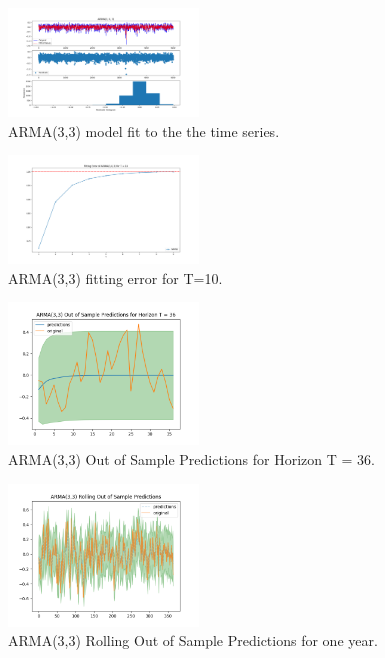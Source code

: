 \documentclass[conference]{IEEEtran}
\begin{document}
\begin{figure}[ht]
    \centering
    \includegraphics[width=0.45\textwidth]{Figures/GlasnevinLin/ARIMA(3,0,3).png}
    \caption{ARMA(3,3) model fit to the the time series.}
    \label{ma33g}
\end{figure}

\begin{figure}[ht]
    \centering
    \includegraphics[width=0.45\textwidth]{Figures/GlasnevinLin/Fitting Error of ARIMA(3,0,3) for T = 10.png}
    \caption{ARMA(3,3) fitting error for T=10.}
    \label{fe33g}
\end{figure}
\vspace{80mm}

\begin{figure}[ht]
    \centering
    \includegraphics[width=0.45\textwidth]{Figures/GlasnevinLin/ARMA(3,3) Out of Sample Predictions for Horizon T = 36.png}
    \caption{ARMA(3,3) Out of Sample Predictions for Horizon T = 36.}
    \label{hor33g}
\end{figure}

\begin{figure}[ht]
    \centering
    \includegraphics[width=0.45\textwidth]{Figures/GlasnevinLin/ARMA(3,3) Rolling Out of Sample Predictions.png}
    \caption{ARMA(3,3) Rolling Out of Sample Predictions for one year.}
    \label{rol33g}
\end{figure}
\end{document}
